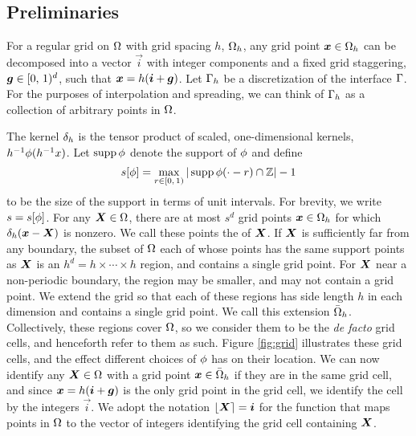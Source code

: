 \subsection{Preliminaries}

For a regular grid on $\Omega$ with grid spacing $h$, $\Omega_h$, any grid point
$\boldsymbol{x}\in\Omega_h$ can be decomposed into a vector $\vec{i}$ with integer components and a
fixed grid staggering, $\boldsymbol{g}\in[0,\,1)^d$, such that $\boldsymbol{x}=h(\boldsymbol{i}+\boldsymbol{g})$. Let
$\Gamma_h$ be a discretization of the interface $\Gamma$. For the purposes of
interpolation and spreading, we can think of $\Gamma_h$ as a collection of arbitrary
points in $\Omega$.



The kernel $\delta_h$ is the tensor product of scaled, one-dimensional kernels,
$h^{-1}\phi(h^{-1}x)$. Let $\operatorname{supp}\phi$ denote the support of $\phi$ and define
\begin{equation}
    s[\phi] = \max_{r\in[0,\,1)}|\operatorname{supp}\phi(\cdot-r)\cap\mathbb{Z}|-1
\end{equation}
to be the size of the support in terms of unit intervals. For brevity, we write
$s=s[\phi]$. For any $\boldsymbol{X}\in\Omega$, there are at most $s^d$ grid points
$\boldsymbol{x}\in\Omega_h$ for which $\delta_h(\boldsymbol{x}-\boldsymbol{X})$ is nonzero. We call these points the
 of $\boldsymbol{X}$. If $\boldsymbol{X}$ is sufficiently far from any boundary, the subset
of $\Omega$ each of whose points has the same support points as $\boldsymbol{X}$ is an
$h^d=h\times\cdots\times h$ region, and contains a single grid point. For $\boldsymbol{X}$ near a
non-periodic boundary, the region may be smaller, and may not contain a grid point. We
extend the grid so that each of these regions has side length $h$ in each dimension and
contains a single grid point.  We call this extension $\bar{\Omega}_h$. Collectively,
these regions cover $\Omega$, so we consider them to be the \emph{de facto} grid cells,
and henceforth refer to them as such. Figure \ref{fig:grid} illustrates these grid cells,
and the effect different choices of $\phi$ has on their location. We can now identify
any $\boldsymbol{X}\in\Omega$ with a grid point $\boldsymbol{x}\in\bar{\Omega}_h$ if they are in the same grid
cell, and since $\boldsymbol{x}=h(\boldsymbol{i}+\boldsymbol{g})$ is the only grid point in the grid cell, we
identify the cell by the integers $\vec{i}$. We adopt the notation $\left\lfloor{\boldsymbol{X}}\right\rceil=\boldsymbol{i}$ for
the function that maps points in $\Omega$ to the vector of integers identifying the grid
cell containing $\boldsymbol{X}$.

